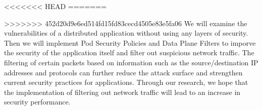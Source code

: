 <<<<<<< HEAD
=======

>>>>>>> 452d20d9e6ed514fd15fd83cecd4505e83e5fa06
We will examine the vulnerabilities of a distributed application without using
any layers of security. Then we will implement Pod Security Policies and Data Plane Filters
to imporve the security of the application itself and filter out suspicious network traffic.
The filtering of certain packets based on information such as the source/destination
IP addresses and protocols can further reduce the attack surface and strengthen current security practices
for applications. Through our research, we hope that the implementation of filtering
out network traffic will lead to an increase in security performance.